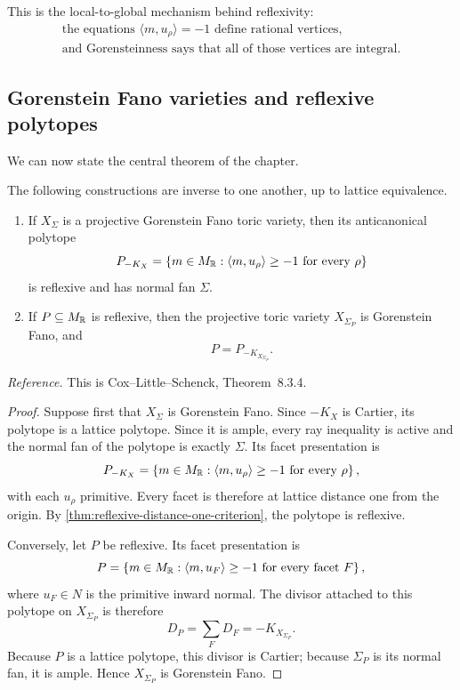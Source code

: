This is the local-to-global mechanism behind reflexivity:
\[
\boxed{
\begin{array}{c}
\text{the equations }\langle m,u_\rho\rangle=-1
\text{ define rational vertices},\\[1mm]
\text{and Gorensteinness says that all of those vertices are integral.}
\end{array}
}
\]

\subsection{Gorenstein Fano varieties and reflexive polytopes}

We can now state the central theorem of the chapter.

\begin{theorem}
\label{thm:gorenstein-fano-reflexive-correspondence}
The following constructions are inverse to one another, up to lattice
equivalence.

\begin{enumerate}[label=(\alph*),wide=0pt]
\item If \(X_\Sigma\) is a projective Gorenstein Fano toric variety,
then its anticanonical polytope
\[
P_{-K_X}
=
\left\{
 m\in M_{\mathbb{R}}:
 \langle m,u_\rho\rangle\geq-1
 \text{ for every }\rho
\right\}
\]
is reflexive and has normal fan \(\Sigma\).

\item If \(P\subseteq M_{\mathbb{R}}\) is reflexive, then the projective toric
variety \(X_{\Sigma_P}\) is Gorenstein Fano, and
\[
P=P_{-K_{X_{\Sigma_P}}}.
\]
\end{enumerate}
\end{theorem}

\noindent
\textit{Reference.}
This is Cox--Little--Schenck, Theorem~8.3.4.

\begin{proof}
Suppose first that \(X_\Sigma\) is Gorenstein Fano. Since \(-K_X\) is
Cartier, its polytope is a lattice polytope. Since it is ample, every
ray inequality is active and the normal fan of the polytope is exactly
\(\Sigma\). Its facet presentation is
\[
P_{-K_X}
=
\left\{
 m\in M_{\mathbb{R}}:
 \langle m,u_\rho\rangle\geq-1
 \text{ for every }\rho
\right\},
\]
with each \(u_\rho\) primitive. Every facet is therefore at lattice
distance one from the origin. By
\cref{thm:reflexive-distance-one-criterion}, the polytope is reflexive.

Conversely, let \(P\) be reflexive. Its facet presentation is
\[
P=
\left\{
 m\in M_{\mathbb{R}}:
 \langle m,u_F\rangle\geq-1
 \text{ for every facet }F
\right\},
\]
where \(u_F\in N\) is the primitive inward normal. The divisor attached
to this polytope on \(X_{\Sigma_P}\) is therefore
\[
D_P=\sum_F D_F=-K_{X_{\Sigma_P}}.
\]
Because \(P\) is a lattice polytope, this divisor is Cartier; because
\(\Sigma_P\) is its normal fan, it is ample. Hence
\(X_{\Sigma_P}\) is Gorenstein Fano.
\end{proof}


